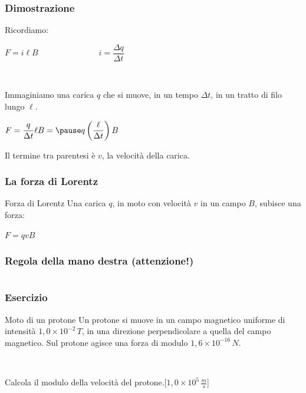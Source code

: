 \documentclass[]{beamer}
\theoremstyle{plain}
\begin{document}
\begin{frame}
\frametitle{Dimostrazione}
Ricordiamo:
\begin{center}
$ F = i\ell B $\pause ~~~~~~~~~~~~~~ $ i = \dfrac{\Delta q}{\Delta t} $
\end{center}\pause

~

Immaginiamo una carica $ q $ che si muove, in un tempo $ \Delta t $, in un tratto di filo lungo $ \ell $.\pause
\begin{center}
$ F = \dfrac{q}{\Delta t} \ell B =\pause q\left(\dfrac{\ell}{\Delta t} \right)B $ 
\end{center}\pause
Il termine tra parentesi è \alert<6>{$ v $, la velocità della carica}.
\end{frame}


\begin{frame}
\frametitle{La forza di Lorentz}
\begin{block}{Forza di Lorentz}
Una carica $ q $, in moto con velocità $ v $ in un campo $ B $, subisce una forza:
\begin{center}
\colorbox{marroncino!30}{$ F = q v B $}
\end{center}
\end{block}
\end{frame}



\begin{frame}
\frametitle{Regola della mano destra (attenzione!)}
\begin{columns}
\begin{column}{0.4\textwidth}
\end{column}
\begin{column}{0.4\textwidth}
\end{column}
\end{columns}
\end{frame}

\begin{frame}
\frametitle{Esercizio}
\begin{exampleblock}{Moto di un protone}
  Un protone si muove in un campo magnetico uniforme di intensità $ 1,0 \times 10^{-2} \, T $, in una direzione perpendicolare a quella del campo magnetico. Sul protone agisce una forza di modulo $ 1,6 \times 10^{-16} \, N $.

  ~

  Calcola il modulo della velocità del protone.\hspace{\fill}[$ 1,0 \times 10^{5} \, \frac{m}{s} $]
\end{exampleblock} 
\end{frame}
\end{document}
